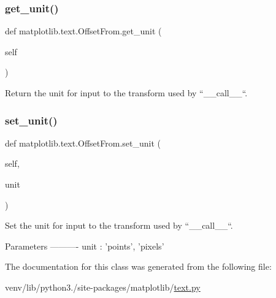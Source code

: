 \subsubsection{\texorpdfstring{get\+\_\+unit()}{get\_unit()}}
{\footnotesize\ttfamily def matplotlib.\+text.\+Offset\+From.\+get\+\_\+unit (\begin{DoxyParamCaption}\item[{}]{self }\end{DoxyParamCaption})}

\begin{DoxyVerb}Return the unit for input to the transform used by ``__call__``.\end{DoxyVerb}
 \mbox{\label{classmatplotlib_1_1text_1_1OffsetFrom_aff16dc535b12bdf8dff86aa04bdaf422}} 
\subsubsection{\texorpdfstring{set\+\_\+unit()}{set\_unit()}}
{\footnotesize\ttfamily def matplotlib.\+text.\+Offset\+From.\+set\+\_\+unit (\begin{DoxyParamCaption}\item[{}]{self,  }\item[{}]{unit }\end{DoxyParamCaption})}

\begin{DoxyVerb}Set the unit for input to the transform used by ``__call__``.

Parameters
----------
unit : {'points', 'pixels'}
\end{DoxyVerb}
 

The documentation for this class was generated from the following file\+:\begin{DoxyCompactItemize}
\item 
venv/lib/python3./site-\/packages/matplotlib/\hyperlink{matplotlib_2text_8py}{text.\+py}\end{DoxyCompactItemize}
